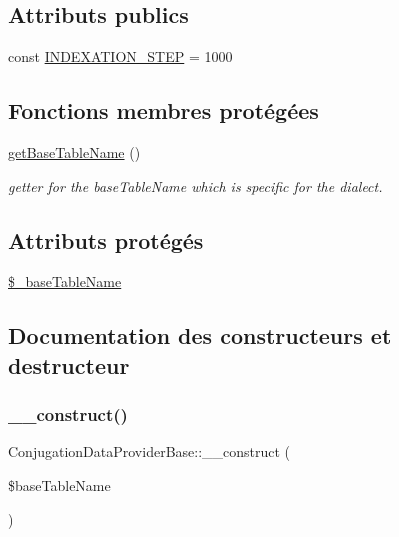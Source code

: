 \subsection*{Attributs publics}
\begin{DoxyCompactItemize}
\item 
const \hyperlink{class_conjugation_data_provider_base_ae4dd22eb6f5454f08a9a9c3ba01e5c89}{I\+N\+D\+E\+X\+A\+T\+I\+O\+N\+\_\+\+S\+T\+EP} = 1000
\end{DoxyCompactItemize}
\subsection*{Fonctions membres protégées}
\begin{DoxyCompactItemize}
\item 
\hyperlink{class_conjugation_data_provider_base_a3649ad489ccc588dccf840445c7432eb}{get\+Base\+Table\+Name} ()
\begin{DoxyCompactList}\small\item\em getter for the base\+Table\+Name which is specific for the dialect. \end{DoxyCompactList}\end{DoxyCompactItemize}
\subsection*{Attributs protégés}
\begin{DoxyCompactItemize}
\item 
\hyperlink{class_conjugation_data_provider_base_ad50a1bb414ca13b00edff121abe0d0a0}{\$\+\_\+base\+Table\+Name}
\end{DoxyCompactItemize}


\subsection{Documentation des constructeurs et destructeur}
\hypertarget{class_conjugation_data_provider_base_ad87a3d61f1cfae6a5e8e6506d1e9b57a}{}\label{class_conjugation_data_provider_base_ad87a3d61f1cfae6a5e8e6506d1e9b57a} 
\subsubsection{\texorpdfstring{\+\_\+\+\_\+construct()}{\_\_construct()}}
{\footnotesize\ttfamily Conjugation\+Data\+Provider\+Base\+::\+\_\+\+\_\+construct (\begin{DoxyParamCaption}\item[{}]{\$base\+Table\+Name }\end{DoxyParamCaption})}



